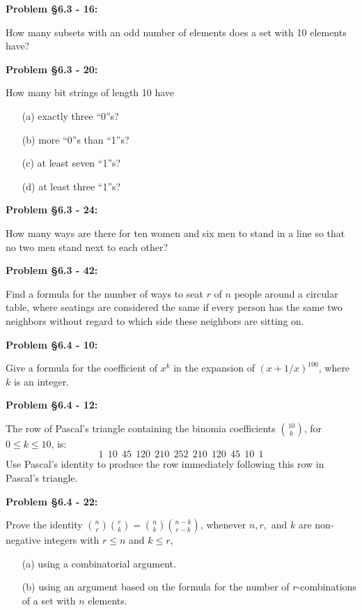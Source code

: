 \documentclass{article}
\newenvironment{problem}[1]
    {\begin{mdframed}[default]
    \textbf{Problem #1:}
    }
    {\end{mdframed}
    }
\begin{document}
\begin{problem}{\S 6.3 - 16}
How many subsets with an odd number of elements does a set with 10 elements have?
\end{problem}

\begin{problem}{\S 6.3 - 20}
How many bit strings of length 10 have
\begin{enumerate}
    \item[(a)] exactly three ``0''s?
    \item[(b)] more ``0''s than ``1''s?
    \item[(c)] at least seven ``1''s?
    \item[(d)] at least three ``1''s?
\end{enumerate}
\end{problem}

\begin{problem}{\S 6.3 - 24}
How many ways are there for ten women and six men to stand in a line so that no two men stand next to each other?
\end{problem}

\begin{problem}{\S 6.3 - 42}
Find a formula for the number of ways to seat $r$ of $n$ people around a circular table, where seatings are considered the same if every person has the same two neighbors without regard to which side these neighbors are sitting on.
\end{problem}

\begin{problem}{\S 6.4 - 10}
Give a formula for the coefficient of $x^k$ in the expansion of $(x+1/x)^{100}$, where $k$ is an integer.
\end{problem}

\begin{problem}{\S 6.4 - 12}
The row of Pascal's triangle containing the binomia coefficients ${ 10 \choose k}$, for $0 \leq k \leq 10$, is:
\[1~~10~~45~~120~~210~~252~~210~~120~~45~~10~~1 \]
Use Pascal's identity to produce the row immediately following this row in Pascal's triangle.
\end{problem}

\begin{problem}{\S 6.4 - 22}
Prove the identity ${n \choose r}{r \choose k} = {n \choose k}{n-k \choose r-k}$, whenever $n, r,$ and $k$ are non-negative integers with $r \leq n$ and $k \leq r$,
\begin{enumerate}
    \item[(a)] using a combinatorial argument.
    \item[(b)] using an argument based on the formula for the number of $r$-combinations of a set with $n$ elements.
\end{enumerate}
\end{problem}
\end{document}
